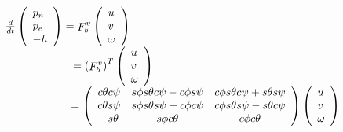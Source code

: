 \[\begin{array}{l}
\frac{d}{{dt}}\left( \begin{array}{l}
{p_n}\\
{p_e}\\
 - h
\end{array} \right) = \mathop F\nolimits_b^v \left( \begin{array}{l}
u\\
v\\
\omega
\end{array} \right)\\
{\kern 1pt} {\kern 1pt} {\kern 1pt} {\kern 1pt} {\kern 1pt} {\kern 1pt} {\kern 1pt} {\kern 1pt} {\kern 1pt} {\kern 1pt} {\kern 1pt} {\kern 1pt} {\kern 1pt} {\kern 1pt} {\kern 1pt} {\kern 1pt} {\kern 1pt} {\kern 1pt} {\kern 1pt} {\kern 1pt} {\kern 1pt} {\kern 1pt} {\kern 1pt} {\kern 1pt} {\kern 1pt} {\kern 1pt} {\kern 1pt} {\kern 1pt} {\kern 1pt} {\kern 1pt} {\kern 1pt} {\kern 1pt} {\kern 1pt} {\kern 1pt} {\kern 1pt} {\kern 1pt} {\kern 1pt} {\kern 1pt} {\kern 1pt} {\kern 1pt} {\kern 1pt} {\kern 1pt} {\kern 1pt} {\kern 1pt} {\kern 1pt} {\kern 1pt} {\kern 1pt} {\kern 1pt} {\kern 1pt} {\kern 1pt} {\kern 1pt} {\kern 1pt} {\kern 1pt} {\kern 1pt} {\kern 1pt} {\kern 1pt} {\kern 1pt} {\kern 1pt} {\kern 1pt}  = {\left( {\mathop F\nolimits_b^v } \right)^T}\left( \begin{array}{l}
u\\
v\\
\omega
\end{array} \right)\\
{\kern 1pt} {\kern 1pt} {\kern 1pt} {\kern 1pt} {\kern 1pt} {\kern 1pt} {\kern 1pt} {\kern 1pt} {\kern 1pt} {\kern 1pt} {\kern 1pt} {\kern 1pt} {\kern 1pt} {\kern 1pt} {\kern 1pt} {\kern 1pt} {\kern 1pt} {\kern 1pt} {\kern 1pt} {\kern 1pt} {\kern 1pt} {\kern 1pt} {\kern 1pt} {\kern 1pt} {\kern 1pt} {\kern 1pt} {\kern 1pt} {\kern 1pt} {\kern 1pt} {\kern 1pt} {\kern 1pt} {\kern 1pt} {\kern 1pt} {\kern 1pt} {\kern 1pt} {\kern 1pt} {\kern 1pt} {\kern 1pt} {\kern 1pt} {\kern 1pt} {\kern 1pt} {\kern 1pt} {\kern 1pt} {\kern 1pt} {\kern 1pt} {\kern 1pt} {\kern 1pt} {\kern 1pt} {\kern 1pt} {\kern 1pt} {\kern 1pt} {\kern 1pt} {\kern 1pt} {\kern 1pt} {\kern 1pt} {\kern 1pt} {\kern 1pt}  = \left( {\begin{array}{*{20}{c}}
{c\theta c\psi }&{s\phi s\theta c\psi  - c\phi s\psi }&{c\phi s\theta c\psi  + s\theta s\psi }\\
{c\theta s\psi }&{s\phi s\theta s\psi  + c\phi c\psi }&{c\phi s\theta s\psi  - s\theta c\psi }\\
{ - s\theta }&{s\phi c\theta }&{c\phi c\theta }
\end{array}} \right)\left( \begin{array}{l}
u\\
v\\
\omega
\end{array} \right)
\end{array}\]

